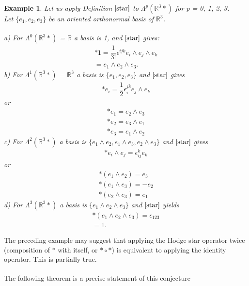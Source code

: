 \documentclass[12pt,a4paper]{article}
\newtheorem{exmp}{Example}[section]
\begin{document}
\begin{exmp}
Let us apply Definition $\ref{star}$ to $\Lambda^p(\mathbb{R}^3*)$ for p = 0, 1, 2, 3.\\
Let $\{e_1, e_2, e_3 \}$ be an oriented orthonormal basis of $\mathbb{R}^3$.
\\\\
a) For $\Lambda^0(\mathbb{R}^3*)$ = $\mathbb{R}$ a basis is 1, and $\ref{star}$ gives:
\begin{eqnarray*}
\ast 1 = \dfrac{1}{3!} \epsilon^{ijk} e_i \wedge e_j \wedge e_k \\
= e_1 \wedge e_2 \wedge e_3.
\end{eqnarray*}
b) For $\Lambda^1(\mathbb{R}^3*)$ = $\mathbb{R}^3$ a basis is $\{e_1, e_2, e_3 \}$ and $\ref{star}$ gives 
\begin{eqnarray*}
\ast e_i = \dfrac{1}{2} \epsilon^{jk}_i e_j \wedge e_k
\end{eqnarray*}
or
\begin{eqnarray*}
\ast e_1 = e_2 \wedge e_3\\
\ast e_2 = e_3 \wedge e_1\\
\ast e_3 = e_1 \wedge e_2
\end{eqnarray*}
c) For $\Lambda^2(\mathbb{R}^3*)$ a basis is $\{ e_1 \wedge e_2, e_1 \wedge e_3, e_2 \wedge e_3 \}$ and $\ref{star}$ gives
\begin{eqnarray*}
\ast e_i \wedge e_j = \epsilon^k_{ij} e_k
\end{eqnarray*}
or
\begin{eqnarray*}
\ast (e_1 \wedge e_2) = e_3\\
\ast (e_1 \wedge e_3) = - e_2\\
\ast(e_2 \wedge e_3) = e_1
\end{eqnarray*}
d) For $\Lambda^3(\mathbb{R}^3*)$ a basis is $\{ e_1 \wedge e_2 \wedge e_3 \}$ and $\ref{star}$ yields
\begin{eqnarray*}
\ast ( e_1 \wedge e_2 \wedge e_3) = \epsilon_{123}\\
= 1.
\end{eqnarray*}
\end{exmp}
The preceding example may suggest that applying the Hodge star operator twice (composition of $\ast$ with itself, or $\ast \circ \ast$) is equivalent to applying the
identity operator. This is partially true. \\\\The following theorem is a precise
statement of this conjecture
\end{document}
